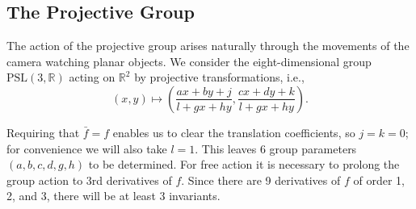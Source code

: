 \documentclass[review,onefignum,onetabnum]{siamonline190516}
\def\R{\mathbb{R}}
\begin{document}




\subsection{The Projective Group}

The action of the projective group arises naturally through the movements of the camera watching planar objects.
We consider the eight-dimensional group $\mathrm{PSL}(3,\R)$ acting on $\R^2$ by projective transformations, i.e., 
\begin{equation}
(x,y) \mapsto \left(\frac{a x + b y + j}{l + g x + h y}, \frac{c x + d y + k}{l+ g x + h y}\right).
\end{equation}

Requiring that $\bar f = f$ enables us to clear the translation coefficients, so $j=k=0$; for convenience we will also take $l=1$. This leaves 6 group parameters $(a,b,c,d,g,h)$ to be determined. For free action it is necessary to prolong the group action to 3rd derivatives of $f$. Since there are 9 derivatives of $f$ of order 1, 2, and 3, there will be at least 3 invariants.
\end{document}
